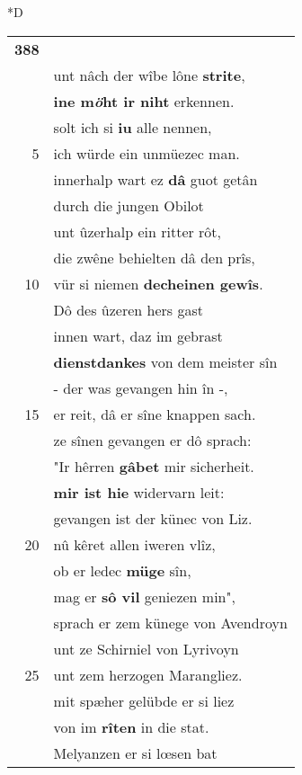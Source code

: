 \documentclass[8pt,a4paper,notitlepage]{article}
\begin{document}
\begin{table}[ht]
\begin{minipage}[t]{0.5\linewidth}
\small
\begin{center}*D
\end{center}
\begin{tabular}{rl}
\textbf{388} & \textbf{\begin{large}D\end{large}er} dâ nâch prîse \textbf{wol rite}\\ 
 & unt nâch der wîbe lône \textbf{strite},\\ 
 & \textbf{ine m\textit{ö}ht ir niht} erkennen.\\ 
 & solt ich si \textbf{iu} alle nennen,\\ 
5 & ich würde ein unmüezec man.\\ 
 & innerhalp wart ez \textbf{dâ} guot getân\\ 
 & durch die jungen Obilot\\ 
 & unt ûzerhalp ein ritter rôt,\\ 
 & die zwêne behielten dâ den prîs,\\ 
10 & vür si niemen \textbf{decheinen gewîs}.\\ 
 & Dô des ûzeren hers gast\\ 
 & innen wart, daz im gebrast\\ 
 & \textbf{dienstdankes} von dem meister sîn\\ 
 & - der was gevangen hin în -,\\ 
15 & er reit, dâ er sîne knappen sach.\\ 
 & ze sînen gevangen er dô sprach:\\ 
 & "Ir hêrren \textbf{gâbet} mir sicherheit.\\ 
 & \textbf{mir ist hie} widervarn leit:\\ 
 & gevangen ist der künec von Liz.\\ 
20 & nû kêret allen iweren vlîz,\\ 
 & ob er ledec \textbf{müge} sîn,\\ 
 & mag er \textbf{sô vil} geniezen min",\\ 
 & sprach er zem künege von Avendroyn\\ 
 & unt ze Schirniel von Lyrivoyn\\ 
25 & unt zem herzogen Marangliez.\\ 
 & mit spæher gelübde er si liez\\ 
 & von im \textbf{rîten} in die stat.\\ 
 & Melyanzen er si lœsen bat\\ 

\end{tabular}
\end{minipage}
\end{table}
\end{document}
